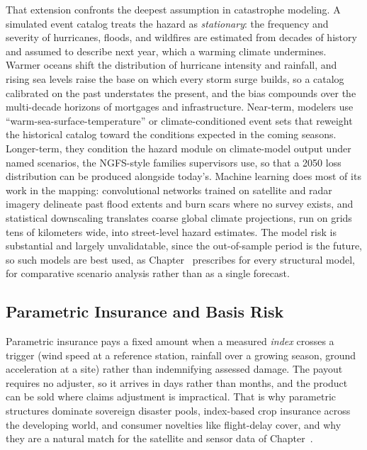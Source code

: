 \documentclass[../ai_in_finance]{subfiles}
\begin{document}
That extension confronts the deepest assumption in catastrophe modeling. A simulated event catalog treats the hazard as \emph{stationary}: the frequency and severity of hurricanes, floods, and wildfires are estimated from decades of history and assumed to describe next year, which a warming climate undermines. Warmer oceans shift the distribution of hurricane intensity and rainfall, and rising sea levels raise the base on which every storm surge builds, so a catalog calibrated on the past understates the present, and the bias compounds over the multi-decade horizons of mortgages and infrastructure. Near-term, modelers use ``warm-sea-surface-temperature'' or climate-conditioned event sets that reweight the historical catalog toward the conditions expected in the coming seasons. Longer-term, they condition the hazard module on climate-model output under named scenarios, the NGFS-style families supervisors use, so that a 2050 loss distribution can be produced alongside today's. Machine learning does most of its work in the mapping: convolutional networks trained on satellite and radar imagery delineate past flood extents and burn scars where no survey exists, and statistical downscaling translates coarse global climate projections, run on grids tens of kilometers wide, into street-level hazard estimates. The model risk is substantial and largely unvalidatable, since the out-of-sample period is the future, so such models are best used, as Chapter~ prescribes for every structural model, for comparative scenario analysis rather than as a single forecast.

\subsection{Parametric Insurance and Basis Risk}
\label{sec:ins-parametric}

Parametric insurance pays a fixed amount when a measured \emph{index} crosses a trigger (wind speed at a reference station, rainfall over a growing season, ground acceleration at a site) rather than indemnifying assessed damage. The payout requires no adjuster, so it arrives in days rather than months, and the product can be sold where claims adjustment is impractical. That is why parametric structures dominate sovereign disaster pools, index-based crop insurance across the developing world, and consumer novelties like flight-delay cover, and why they are a natural match for the satellite and sensor data of Chapter~.
\end{document}

